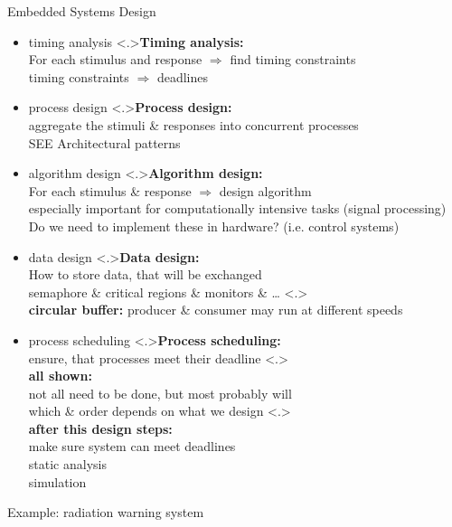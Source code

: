 \documentclass[ngerman={babel}, utf8, bigger, t, xcolor={table,dvipsnames}, ompress, hyperref={bookmarks,colorlinks},red]{beamer}
\begin{document}
\begin{frame}{Embedded Systems Design}
\begin{itemize}
\begin{itemize}
\begin{enumerate}
				\end{enumerate}
			\item timing analysis
			\note<.>{\textbf{Timing analysis:}\\ For each stimulus and response $\Rightarrow$ find timing constraints \\ timing constraints $\Rightarrow$ deadlines}
			\item process design
			\note<.>{\textbf{Process design:}\\ aggregate the stimuli \& responses into concurrent processes \\
			SEE Architectural patterns}
			\item algorithm design
			\note<.>{\textbf{Algorithm design:}\\ For each stimulus \& response $\Rightarrow$ design algorithm \\ especially important for computationally intensive tasks (signal processing) \\ Do we need to implement these in hardware? (i.e. control systems)}
			\item data design
			\note<.>{\textbf{Data design:}\\ How to store data, that will be exchanged \\ semaphore \& critical regions \& monitors \& \dots}
			\note<.>{\\ \vspace*{2em} \textbf{circular buffer:} producer \& consumer may run at different speeds}
			\item process scheduling
			\note<.>{\textbf{Process scheduling:}\\ ensure, that processes meet their deadline}
			\note<.>{\ \\ \vspace*{2em} \textbf{all shown:}\\ not all need to be done, but most probably will \\ which \& order depends on what we design }
			\note<.>{\\ \vspace*{1em} \textbf{after this design steps:}\\ make sure system can meet deadlines \\ static analysis \\ simulation
			}
		\end{itemize}
	\end{itemize}
\end{frame}

\begin{frame}{Example: radiation warning system}
	
\end{frame}
\end{document}
